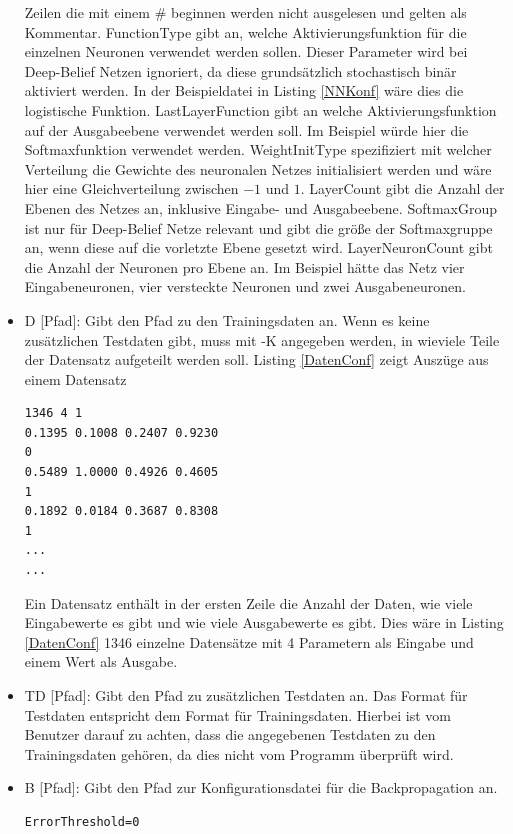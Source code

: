 \documentclass[12pt]{article}
\begin{document}
\begin{itemize}
\begin{lstlisting}[caption={Beispielkonfigurationsdatei für ein neuronales Netz},captionpos=b, label=NNKonf]
\end{lstlisting} 
Zeilen die mit einem \# beginnen werden nicht ausgelesen und gelten als Kommentar. FunctionType gibt an, welche Aktivierungsfunktion für die einzelnen Neuronen verwendet werden sollen. Dieser Parameter wird bei Deep-Belief Netzen ignoriert, da diese grundsätzlich stochastisch binär aktiviert werden. In der Beispieldatei in Listing \ref{NNKonf} wäre dies die logistische Funktion. LastLayerFunction gibt an welche Aktivierungsfunktion auf der Ausgabeebene verwendet werden soll. Im Beispiel würde hier die Softmaxfunktion verwendet werden. WeightInitType spezifiziert mit welcher Verteilung die Gewichte des neuronalen Netzes initialisiert werden und wäre hier eine Gleichverteilung zwischen $-1$ und $1$. LayerCount gibt die Anzahl der Ebenen des Netzes an, inklusive Eingabe- und Ausgabeebene. SoftmaxGroup ist nur für Deep-Belief Netze relevant und gibt die größe der Softmaxgruppe an, wenn diese auf die vorletzte Ebene gesetzt wird. LayerNeuronCount gibt die Anzahl der Neuronen pro Ebene an. Im Beispiel hätte das Netz vier Eingabeneuronen, vier versteckte Neuronen und zwei Ausgabeneuronen.
\item D [Pfad]: Gibt den Pfad zu den Trainingsdaten an. Wenn es keine zusätzlichen Testdaten gibt, muss mit -K angegeben werden, in wieviele Teile der Datensatz aufgeteilt werden soll. Listing \ref{DatenConf} zeigt Auszüge aus einem Datensatz
\begin{lstlisting}[caption= {Auszug aus einem der verwendeten Datensätze}, captionpos=b, label={DatenConf}]
1346 4 1
0.1395 0.1008 0.2407 0.9230
0
0.5489 1.0000 0.4926 0.4605
1
0.1892 0.0184 0.3687 0.8308
1
...
...
\end{lstlisting}
Ein Datensatz enthält in der ersten Zeile die Anzahl der Daten, wie viele Eingabewerte es gibt und wie viele Ausgabewerte es gibt. Dies wäre in Listing \ref{DatenConf} 1346 einzelne Datensätze mit 4 Parametern als Eingabe und einem Wert als Ausgabe. 
\item TD [Pfad]: Gibt den Pfad zu zusätzlichen Testdaten an. Das Format für Testdaten entspricht dem Format für Trainingsdaten. Hierbei ist vom Benutzer darauf zu achten, dass die angegebenen Testdaten zu den Trainingsdaten gehören, da dies nicht vom Programm überprüft wird.
\item B [Pfad]: Gibt den Pfad zur Konfigurationsdatei für die Backpropagation an. 
\begin{lstlisting}[captionpos=b,caption={Beispielkonfiguration für den Backpropagation-Algorithmus},label={BPConf}]
ErrorThreshold=0

\end{lstlisting}
\end{itemize}
\end{document}
